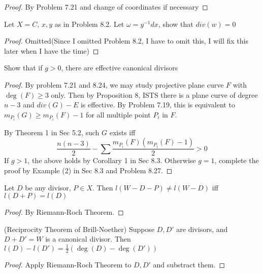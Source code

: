 \documentclass{solution}
\begin{document}
\begin{proof}
    By Problem 7.21 and change of coordinates if necessary
\end{proof}

\begin{problem}{8.27}
    Let $X = C$, $x, y$ as in Problem 8.2. Let $\omega = y ^{-1} dx$, show that $div(w) = 0$
\end{problem}

\begin{proof}
    Omitted(Since I omitted Problem 8.2, I have to omit this, I will fix this later when I have the time)
\end{proof}

\begin{problem}{8.28}
    Show that if $g \gt 0$, there are effective canonical divisors
\end{problem}

\begin{proof}
    By problem 7.21 and 8.24, we may study projective plane curve $F$ with $\deg(F) \ge 3$ only. Then by Proposition 8, ISTS there is a plane curve of degree $n - 3$ and $div(G) - E$ is effective. By Problem 7.19, this is equivalent to $m_{P_i}(G) \ge m_{P_i}(F) - 1$ for all multiple point $P_i$ in $F$.

    By Theorem 1 in Sec 5.2, such $G$ exists iff
    $$\frac{n(n - 3)}{2} - \sum \frac{m_{P_i}(F)(m_{P_i}(F) - 1)}{2} \gt 0$$
    If $g \gt 1$, the above holds by Corollary 1 in Sec 8.3. Otherwise $g = 1$, complete the proof by Example (2) in Sec 8.3 and Problem 8.27.
\end{proof}

\begin{problem}{8.29}
    Let $D$ be any divisor, $P \in X$. Then $l(W - D - P) \ne l(W - D)$ iff $l(D + P) = l(D)$
\end{problem}

\begin{proof}
    By Riemann-Roch Theorem.
\end{proof}

\begin{problem}{8.30}
    (Reciprocity Theorem of Brill-Noether) Suppose $D, D'$ are divisors, and $D + D' = W$ is a canonical divisor. Then $l(D) - l(D') = \frac{1}{2} (\deg(D) - \deg(D'))$
\end{problem}

\begin{proof}
    Apply Riemann-Roch Theorem to $D, D'$ and substract them.
\end{proof}
\end{document}
